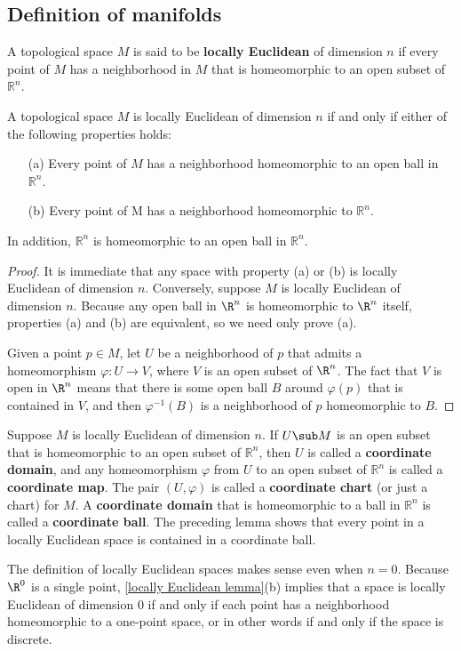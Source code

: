 \subsection{Definition of manifolds}
A topological space $M$ is said to be \textbf{locally Euclidean} of dimension $n$ if every point of $M$ has a neighborhood in $M$ that is homeomorphic to an open subset of $\mathbb{R}^n$.
\begin{lemma}\label{locally Euclidean lemma}
A topological space $M$ is locally Euclidean of dimension $n$ if and
only if either of the following properties holds:
\begin{itemize}
\item[(a)] Every point of $M$ has a neighborhood homeomorphic to an open ball in $\mathbb{R}^n$.
\item[(b)] Every point of M has a neighborhood homeomorphic to $\mathbb{R}^n$.
\end{itemize} 
In addition, $\mathbb{R}^n$ is homeomorphic to an open ball in $\mathbb{R}^n$.
\end{lemma}
\begin{proof}
It is immediate that any space with property (a) or (b) is locally Euclidean of dimension $n$. Conversely, suppose $M$ is locally Euclidean of dimension $n$. Because any open ball in $\R^n$ is homeomorphic to $\R^n$ itself, properties (a) and (b) are equivalent, so we need only prove (a).\par
Given a point $p\in M$, let $U$ be a neighborhood of $p$ that admits a homeomorphism $\varphi:U\to V$, where $V$ is an open subset of $\R^n$. The fact that $V$ is open in $\R^n$ means that there is some open ball $B$ around $\varphi(p)$ that is contained in $V$, and then $\varphi^{-1}(B)$ is a neighborhood of $p$ homeomorphic to $B$.
\end{proof}
Suppose $M$ is locally Euclidean of dimension $n$. If $U\sub M$ is an open subset that is homeomorphic to an open subset of $\mathbb{R}^n$, then $U$ is called a \textbf{coordinate domain}, and any homeomorphism $\varphi$ from $U$ to an open subset of $\mathbb{R}^n$ is called a \textbf{coordinate map}. The pair $(U,\varphi)$ is called a \textbf{coordinate chart} (or just a chart) for $M$. A \textbf{coordinate domain} that is homeomorphic to a ball in $\mathbb{R}^n$ is called a \textbf{coordinate ball}. The preceding lemma shows that every point in a locally Euclidean space is contained in a coordinate ball.\par
The definition of locally Euclidean spaces makes sense even when $n=0$. Because $\R^0$ is a single point, \cref{locally Euclidean lemma}(b) implies that a space is locally Euclidean of dimension $0$ if and only if each point has a neighborhood homeomorphic to a one-point space, or in other words if and only if the space is discrete.
